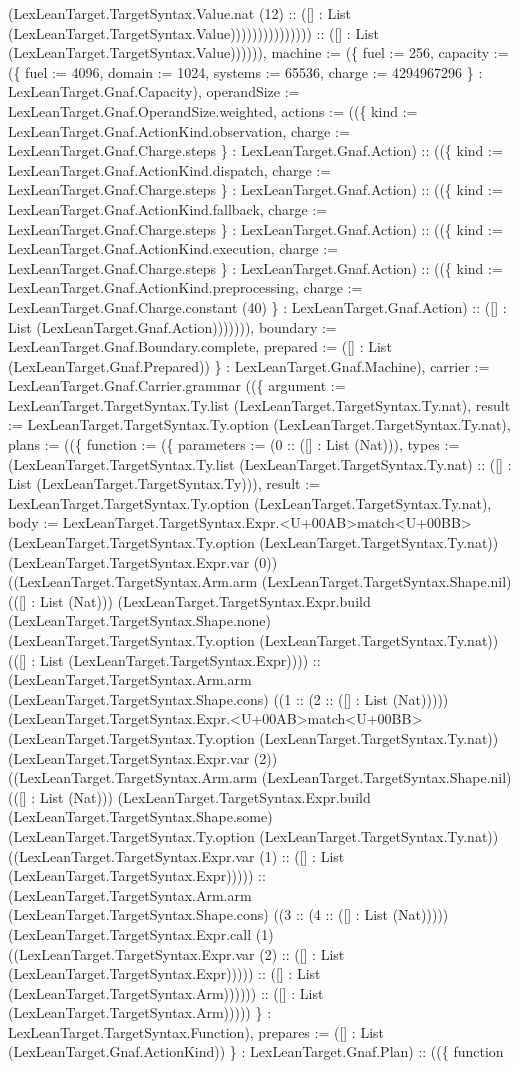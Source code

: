 \documentclass[11pt]{article}
\begin{document}
(LexLeanTarget.TargetSyntax.Value.nat (12) :: ([] : List (LexLeanTarget.TargetSyntax.Value))))))))))))))) :: ([] : List (LexLeanTarget.TargetSyntax.Value)))))), machine := (\{ fuel := 256, capacity := (\{ fuel := 4096, domain := 1024, systems := 65536, charge := 4294967296 \} : LexLeanTarget.Gnaf.Capacity), operandSize := LexLeanTarget.Gnaf.OperandSize.weighted, actions := ((\{ kind := LexLeanTarget.Gnaf.ActionKind.observation, charge := LexLeanTarget.Gnaf.Charge.steps \} : LexLeanTarget.Gnaf.Action) :: ((\{ kind := LexLeanTarget.Gnaf.ActionKind.dispatch, charge := LexLeanTarget.Gnaf.Charge.steps \} : LexLeanTarget.Gnaf.Action) :: ((\{ kind := LexLeanTarget.Gnaf.ActionKind.fallback, charge := LexLeanTarget.Gnaf.Charge.steps \} : LexLeanTarget.Gnaf.Action) :: ((\{ kind := LexLeanTarget.Gnaf.ActionKind.execution, charge := LexLeanTarget.Gnaf.Charge.steps \} : LexLeanTarget.Gnaf.Action) :: ((\{ kind := LexLeanTarget.Gnaf.ActionKind.preprocessing, charge := LexLeanTarget.Gnaf.Charge.constant (40) \} : LexLeanTarget.Gnaf.Action) :: ([] : List (LexLeanTarget.Gnaf.Action))))))), boundary := LexLeanTarget.Gnaf.Boundary.complete, prepared := ([] : List (LexLeanTarget.Gnaf.Prepared)) \} : LexLeanTarget.Gnaf.Machine), carrier := LexLeanTarget.Gnaf.Carrier.grammar ((\{ argument := LexLeanTarget.TargetSyntax.Ty.list (LexLeanTarget.TargetSyntax.Ty.nat), result := LexLeanTarget.TargetSyntax.Ty.option (LexLeanTarget.TargetSyntax.Ty.nat), plans := ((\{ function := (\{ parameters := (0 :: ([] : List (Nat))), types := (LexLeanTarget.TargetSyntax.Ty.list (LexLeanTarget.TargetSyntax.Ty.nat) :: ([] : List (LexLeanTarget.TargetSyntax.Ty))), result := LexLeanTarget.TargetSyntax.Ty.option (LexLeanTarget.TargetSyntax.Ty.nat), body := LexLeanTarget.TargetSyntax.Expr.<U+00AB>match<U+00BB> (LexLeanTarget.TargetSyntax.Ty.option (LexLeanTarget.TargetSyntax.Ty.nat)) (LexLeanTarget.TargetSyntax.Expr.var (0)) ((LexLeanTarget.TargetSyntax.Arm.arm (LexLeanTarget.TargetSyntax.Shape.nil) (([] : List (Nat))) (LexLeanTarget.TargetSyntax.Expr.build (LexLeanTarget.TargetSyntax.Shape.none) (LexLeanTarget.TargetSyntax.Ty.option (LexLeanTarget.TargetSyntax.Ty.nat)) (([] : List (LexLeanTarget.TargetSyntax.Expr)))) :: (LexLeanTarget.TargetSyntax.Arm.arm (LexLeanTarget.TargetSyntax.Shape.cons) ((1 :: (2 :: ([] : List (Nat))))) (LexLeanTarget.TargetSyntax.Expr.<U+00AB>match<U+00BB> (LexLeanTarget.TargetSyntax.Ty.option (LexLeanTarget.TargetSyntax.Ty.nat)) (LexLeanTarget.TargetSyntax.Expr.var (2)) ((LexLeanTarget.TargetSyntax.Arm.arm (LexLeanTarget.TargetSyntax.Shape.nil) (([] : List (Nat))) (LexLeanTarget.TargetSyntax.Expr.build (LexLeanTarget.TargetSyntax.Shape.some) (LexLeanTarget.TargetSyntax.Ty.option (LexLeanTarget.TargetSyntax.Ty.nat)) ((LexLeanTarget.TargetSyntax.Expr.var (1) :: ([] : List (LexLeanTarget.TargetSyntax.Expr))))) :: (LexLeanTarget.TargetSyntax.Arm.arm (LexLeanTarget.TargetSyntax.Shape.cons) ((3 :: (4 :: ([] : List (Nat))))) (LexLeanTarget.TargetSyntax.Expr.call (1) ((LexLeanTarget.TargetSyntax.Expr.var (2) :: ([] : List (LexLeanTarget.TargetSyntax.Expr))))) :: ([] : List (LexLeanTarget.TargetSyntax.Arm)))))) :: ([] : List (LexLeanTarget.TargetSyntax.Arm))))) \} : LexLeanTarget.TargetSyntax.Function), prepares := ([] : List (LexLeanTarget.Gnaf.ActionKind)) \} : LexLeanTarget.Gnaf.Plan) :: ((\{ function 
\end{document}
